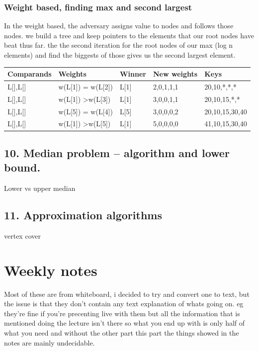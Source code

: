 \documentclass[a4paper,10pt,titlepage]{report}
\begin{document}
\subsection{Weight based, finding max and second largest}
In the weight based, the adversary assigns value to nodes and follows those nodes.
we build a tree and keep pointers to the elements that our root nodes have beat thus far. the the second iteration for the root nodes of our max (log n elements) and find the biggests of those gives us the second largest element.
\begin{tabular}{lllll}
\hline
Comparands & Weights & Winner & New weights & Keys \\ \hline
L{[}{]},L{[}{]} & w(L{[}1{]}) = w(L{[}2{]}) & L{[}1{]} & 2,0,1,1,1 & 20,10,*,*,* \\
L{[}{]},L{[}{]} & w(L{[}1{]}) \textgreater w(L{[}3{]}) & L{[}1{]} & 3,0,0,1,1 & 20,10,15,*,* \\
L{[}{]},L{[}{]} & w(L{[}5{]}) = w(L{[}4{]}) & L{[}5{]} & 3,0,0,0,2 & 20,10,15,30,40 \\
L{[}{]},L{[}{]} & w(L{[}1{]}) \textgreater w(L{[}5{]}) & L{[}1{]} & 5,0,0,0,0 & 41,10,15,30,40 \\ \hline
\end{tabular}
\vspace{5mm}



\newpage
\section{10. Median problem – algorithm and lower bound.}

Lower vs upper median



\newpage
\section{11. Approximation algorithms}

vertex cover





\newpage
\chapter{Weekly notes}
Most of these are from whiteboard, i decided to try and convert one to text, but the issue is that they don't contain any text explanation of whats going on. eg they're fine if you're precenting live with them but all the information that is mentioned doing the lecture isn't there so what you end up with is only half of what you need and without the other part this part the things showed in the notes are mainly undecidable.\\
\end{document}

